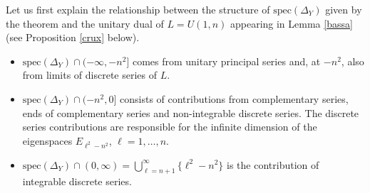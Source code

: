 \documentclass[10]{amsart}
\theoremstyle{remark}
\theoremstyle{definition}
\numberwithin{equation}{section}
\newcommand{\spec}{{\mathrm{spec}}}
\begin{document}
{Let us first explain the relationship between the structure of $\spec(\Delta_Y)$ given by the theorem and the unitary dual of $L=U(1,n)$ appearing in 
Lemma \ref{bassa} (see Proposition \ref{crux} below).
\begin{itemize}
\item $\spec(\Delta_Y)\cap (-\infty,-n^2]$ comes from unitary principal series and, at $-n^2$, also from limits of discrete series of $L$. 
\item $\spec(\Delta_Y)\cap (-n^2,0]$ consists of contributions from complementary series, ends of complementary series and non-integrable discrete series.
The discrete series contributions are responsible for the infinite dimension of the eigenspaces $E_{\ell^2-n^2}$, $\ell=1,\dots, n$.
\item $\spec(\Delta_Y)\cap (0,\infty)=\displaystyle\bigcup_{\ell=n+1}^\infty \{\ell^2-n^2\}$ is the contribution of integrable discrete series.
\end{itemize}
%
%
%
%
%
}
\end{document}
